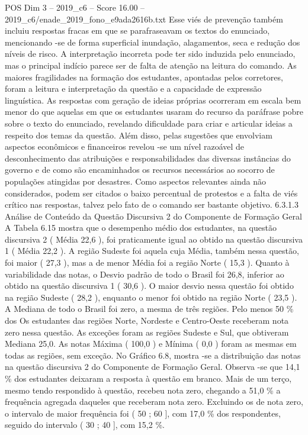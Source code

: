 \begin{textsample}{POS Dim 3 – 2019\_c6 – Score 16.00 – 2019\_c6/enade\_2019\_fono\_e9ada2616b.txt}
Esse viés de prevenção também incluiu respostas fracas em que se parafraseavam os textos do enunciado, mencionando -se de forma superficial inundação, alagamentos, seca e redução dos níveis de risco.
A interpretação incorreta pode ter sido induzida pelo enunciado, mas o principal indício parece ser de falta de atenção na leitura do comando.
As maiores fragilidades na formação dos estudantes, apontadas pelos corretores, foram a leitura e interpretação da questão e a capacidade de expressão linguística.
As respostas com geração de ideias próprias ocorreram em escala bem menor do que aquelas em que os estudantes usaram do recurso da paráfrase pobre sobre o texto do enunciado, revelando dificuldade para criar e articular ideias a respeito dos temas da questão.
Além disso, pelas sugestões que envolviam aspectos econômicos e financeiros revelou -se um nível razoável de desconhecimento das atribuições e responsabilidades das diversas instâncias do governo e de como são encaminhados os recursos necessários ao socorro de populações atingidas por desastres.
Como aspectos relevantes ainda não considerados, podem ser citados o baixo percentual de protestos e a falta de viés crítico nas respostas, talvez pelo fato de o comando ser bastante objetivo. 6.3.1.3 Análise de Conteúdo da Questão Discursiva 2 do Componente de Formação Geral A Tabela 6.15 mostra que o desempenho médio dos estudantes, na questão discursiva 2 ( Média 22,6 ), foi praticamente igual ao obtido na questão discursiva 1 ( Média 22,2 ).
A região Sudeste foi aquela cuja Média, também nessa questão, foi maior ( 27,3 ), mas a de menor Média foi a região Norte ( 15,3 ).
Quanto à variabilidade das notas, o Desvio padrão de todo o Brasil foi 26,8, inferior ao obtido na questão discursiva 1 ( 30,6 ).
O maior desvio nessa questão foi obtido na região Sudeste ( 28,2 ), enquanto o menor foi obtido na região Norte ( 23,5 ).
A Mediana de todo o Brasil foi zero, a mesma de três regiões.
Pelo menos 50 \% dos Os estudantes das regiões Norte, Nordeste e Centro-Oeste receberam nota zero nessa questão.
As exceções foram as regiões Sudeste e Sul, que obtiveram Mediana 25,0.
As notas Máxima ( 100,0 ) e Mínima ( 0,0 ) foram as mesmas em todas as regiões, sem exceção.
No Gráfico 6.8, mostra -se a distribuição das notas na questão discursiva 2 do Componente de Formação Geral.
Observa -se que 14,1 \% dos estudantes deixaram a resposta à questão em branco.
Mais de um terço, mesmo tendo respondido à questão, recebeu nota zero, chegando a 51,0 \% a frequência agregada daqueles que receberam nota zero.
Excluindo os de nota zero, o intervalo de maior frequência foi ( 50 ; 60 ], com 17,0 \% dos respondentes, seguido do intervalo ( 30 ; 40 ], com 15,2 \%.

\end{textsample}
